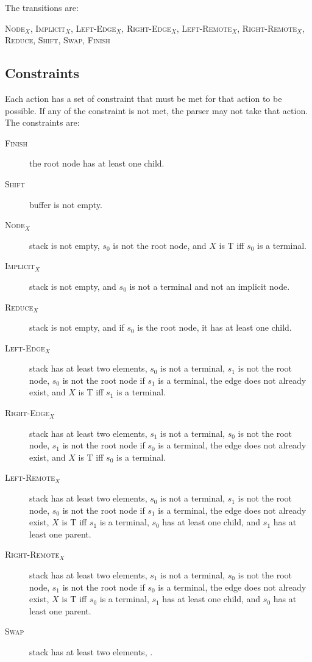 \documentclass[11pt]{article}
\begin{document}
The transitions are:

\textsc{Node$_X$, Implicit$_X$, Left-Edge$_X$, Right-Edge$_X$, Left-Remote$_X$, Right-Remote$_X$, Reduce, Shift, Swap, Finish}

\subsection{Constraints}
Each action has a set of constraint that must be met for that action to be possible. If any of the constraint is not met, the parser may not take that action. The constraints are:
\begin{description}
	\item[\textsc{Finish}] the root node has at least one child.
	\item[\textsc{Shift}] buffer is not empty.
	\item[\textsc{Node$_X$}] stack is not empty, $s_0$ is not the root node, and $X$ is T iff $s_0$ is a terminal.
	\item[\textsc{Implicit$_X$}] stack is not empty, and $s_0$ is not a terminal and not an implicit node.
	\item[\textsc{Reduce$_X$}] stack is not empty, and if $s_0$ is the root node, it has at least one child.
	\item[\textsc{Left-Edge$_X$}] stack has at least two elements, $s_0$ is not a terminal, $s_1$ is not the root node, $s_0$ is not the root node if $s_1$ is a terminal, the edge does not already exist, and $X$ is T iff $s_1$ is a terminal.
	\item[\textsc{Right-Edge$_X$}] stack has at least two elements, $s_1$ is not a terminal, $s_0$ is not the root node, $s_1$ is not the root node if $s_0$ is a terminal, the edge does not already exist, and $X$ is T iff $s_0$ is a terminal.
	\item[\textsc{Left-Remote$_X$}] stack has at least two elements, $s_0$ is not a terminal, $s_1$ is not the root node, $s_0$ is not the root node if $s_1$ is a terminal, the edge does not already exist, $X$ is T iff $s_1$ is a terminal, $s_0$ has at least one child, and $s_1$ has at least one parent.
	\item[\textsc{Right-Remote$_X$}] stack has at least two elements, $s_1$ is not a terminal, $s_0$ is not the root node, $s_1$ is not the root node if $s_0$ is a terminal, the edge does not already exist, $X$ is T iff $s_0$ is a terminal, $s_1$ has at least one child, and $s_0$ has at least one parent.
	\item[\textsc{Swap}] stack has at least two elements, .
\end{description}
\end{document}
